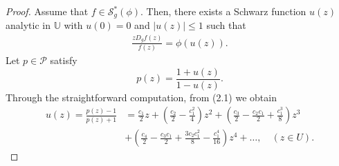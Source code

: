 \documentclass[11pt,twoside, reqno]{article}
\theoremstyle{definition}
\begin{document}
\begin{proof}
Assume that $f\in\mathcal{S}^{\ast }_{g}(\phi)$. Then, there exists a Schwarz function $u(z)$ analytic in $\mathbb{U}$ with $u(0) = 0$ and $|u(z)| \leq 1$ such that
\begin{align}\label{e2.2}
\frac{zD_{g}f(z)}{f(z)}=\phi(u(z)).
\end{align}
Let $p \in \mathcal{P}$ satisfy
\begin{equation*}
p(z) = \frac{1+u(z)}{1-u(z)} .
\end{equation*}
Through the straightforward computation, from (2.1) we obtain
\begin{align*}
u(z) = \frac{p(z) - 1}{p(z) + 1} &= \frac{c_1}{2}z + \left(\frac{c_2}{2} - \frac{c_1^2}{4}\right)z^2 + \left(\frac{c_3}{2} - \frac{c_2c_1}{2} + \frac{c_1^3}{8}\right)z^3 \\
&+ \left(\frac{c_4}{2} - \frac{c_3c_1}{2} + \frac{3c_2c_1^2}{8} - \frac{c_1^4}{16}\right)z^4 + \ldots, \quad (z \in U).
\end{align*}


\end{proof}
\end{document}
